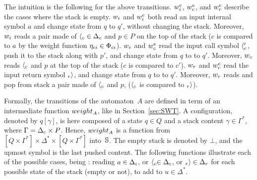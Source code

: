 \noindent
The intuition is the following for the above transitions.
$\weiei$, $\weiec$, and $\weier$ describe the cases where the stack is empty.
%
\noindent
$\weii$ and $\weiei$ both read an input internal symbol $a$ and change state from $q$ to $q'$,
without changing the stack.
Moreover, $\weii$ reads a pair made of
${\call{c}} \in \Deltac$ and $p \in P$ on the top of the stack
($c$ is compared to $a$ by the weight function $\eta_\mathsf{ci} \in \Phici$).
%
\noindent
$\weic$ and $\weiec$ read the input call symbol $\langle_{c}'$,
push it to the stack along with $p'$, and change state from $q$ to to $q'$.
Moreover, $\weic$ reads ${\langle_{c}}$ and $p$ at the top of the stack
($c$ is compared to $c'$).
%
\noindent
$\weir$ and $\weier$ read the input return symbol $_{r}{\rangle}$, and change state from $q$ to to $q'$.
Moreover, $\weir$ reads and pop from stack a pair made of $\langle_{c}$ and $p$,
($\langle_{c}$ is compared to $_{r}{\rangle}$).

Formally, the transitions of the automaton~$A$ are defined
in term of %
an intermediate function $\weight_A$, like in Section~\ref{sec:SWT}.
A configuration, denoted by $q[\gamma]$,
is here composed of a state $q \in Q$
and a stack content $\gamma \in \Gamma^*$,
where $\Gamma = \Deltac \times P$.
Hence, $\weight_A$ is a function from
$[Q \times \Gamma^*] \times \Delta^* \times [Q \times \Gamma^*]$ into~$\mathbb{S}$.
The empty stack is denoted by $\bot$, and the upmost symbol is the last pushed content.
The following functions illustrate each of the possible cases, being : reading $a \in \Deltai$,
or $\call{c} \in \Deltac$, or $\return{r} \in \Deltar$ for each possible state of the stack (empty or not),
to add to $u \in {\Delta}^*$.

